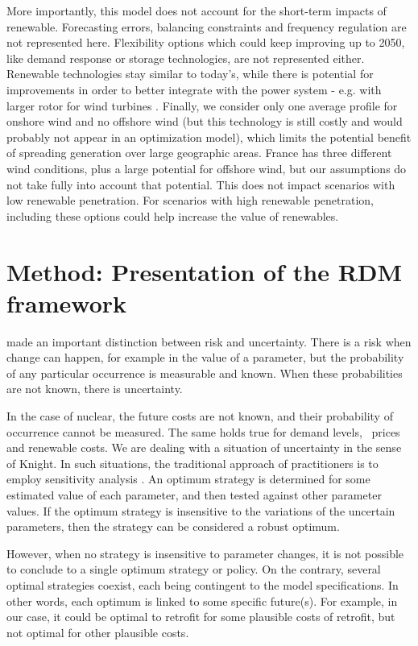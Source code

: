 More importantly, this model does not account for the short-term impacts of renewable. Forecasting errors, balancing constraints and frequency regulation are not represented here. Flexibility options which could keep improving up to 2050, like demand response or storage technologies, are not represented either. Renewable technologies stay similar to today's, while there is potential for improvements in order to better integrate with the power system - e.g. with larger rotor for wind turbines \citep{Hirth2016}. Finally, we consider only one average profile for onshore wind and no offshore wind (but this technology is still costly and would probably not appear in an optimization model), which limits the potential benefit of spreading generation over large geographic areas. France has three different wind conditions, plus a large potential for offshore wind, but our assumptions do not take fully into account that potential.
This does not impact scenarios with low renewable penetration. For scenarios with high renewable penetration, including these options could help increase the value of renewables.




\section{Method: Presentation of the RDM framework}
\label{sec:method}

\citet{Knight1921} made an important distinction between risk and uncertainty. There is a risk when change can happen, for example in the value of a parameter, but the probability of any particular occurrence is measurable and known. When these probabilities are not known, there is uncertainty. 

In the case of nuclear, the future costs are not known, and their probability of occurrence cannot be measured. The same holds true for demand levels, \coo\ prices and renewable costs. We are dealing with a situation of uncertainty in the sense of Knight. In such situations, the traditional approach of practitioners is to employ sensitivity analysis \citep{Saltelli2000}. An optimum strategy is determined for some estimated value of each parameter, and then tested against other parameter values. If the optimum strategy is insensitive to the variations of the uncertain parameters, then the strategy can be considered a robust optimum.

However, when no strategy is insensitive to parameter changes, it is not possible to conclude to a single optimum strategy or policy. On the contrary, several optimal strategies coexist, each being contingent to the model specifications. In other words, each optimum is linked to some specific future(s). For example, in our case, it could be optimal to retrofit for some plausible costs of retrofit, but not optimal for other plausible costs. 

